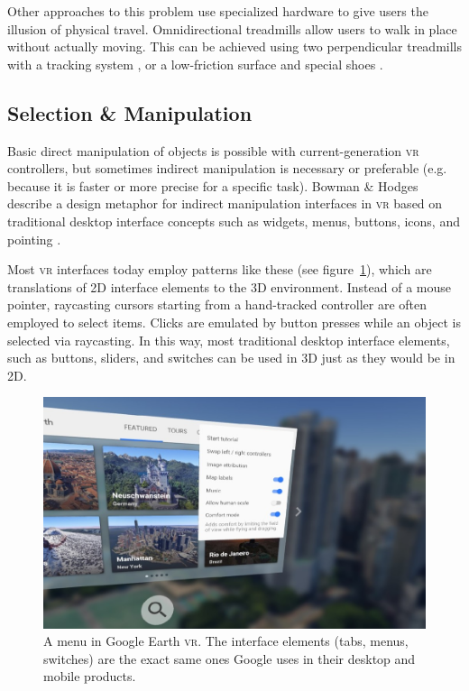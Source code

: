 \documentclass[nobib]{tufte-book} %
\begin{document}
Other approaches to this problem use specialized hardware to give users the illusion of physical travel. Omnidirectional treadmills allow users to walk in place without actually moving. This can be achieved using two perpendicular treadmills with a tracking system \cite[-3.3cm]{darken1997omni}, or a low-friction surface and special shoes \cite[-1cm]{warren2017omni}.

\subsection{Selection \& Manipulation}
Basic direct manipulation of objects is possible with current-generation \textsc{vr} controllers, but sometimes indirect manipulation is necessary or preferable (e.g. because it is faster or more precise for a specific task). Bowman \& Hodges describe a design metaphor for indirect manipulation interfaces in \textsc{vr}  based on traditional desktop interface concepts such as widgets, menus, buttons, icons, and pointing \cite{bowman1994wimp}.

Most \textsc{vr} interfaces today employ patterns like these (see figure~\ref{fig:earth-menu}), which are translations of 2D interface elements to the 3D environment. Instead of a mouse pointer, raycasting cursors starting from a hand-tracked controller are often employed to select items. Clicks are emulated by button presses while an object is selected via raycasting. In this way, most traditional desktop interface elements, such as buttons, sliders, and switches can be used in 3D just as they would be in 2D.

\begin{figure}
  \includegraphics{earth-menu.png}
  \caption{A menu in Google Earth \textsc{vr}. The interface elements (tabs, menus, switches) are the exact same ones Google uses in their desktop and mobile products.}
  \label{fig:earth-menu}
\end{figure}
\end{document}
